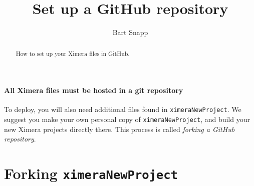 \documentclass{ximera}
\title{Set up a GitHub repository}
\author{Bart Snapp}
\begin{document}
\begin{abstract}
  How to set up your Ximera files in GitHub.
\end{abstract}
\maketitle


\paragraph{All Ximera files must be hosted in a git repository} To deploy, you
will also need	additional
files found in \verb!ximeraNewProject!. We suggest you make your own personal copy of  \verb!ximeraNewProject!, and build your new Ximera projects directly there.
This process is called \textit{forking a GitHub repository}.



\section{Forking \texttt{ximeraNewProject}}
\end{document}
